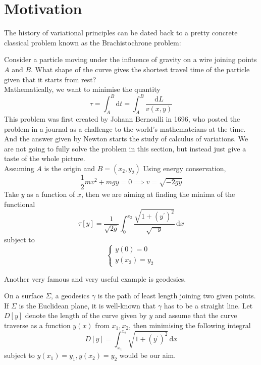 \documentclass{article}
\begin{document}
\maketitle
\tableofcontents
\setcounter{section}{-1}
\newpage

\section{Motivation}
The history of variational principles can be dated back to a pretty concrete classical problem known as the Brachistochrone problem:
\begin{example}
    Consider a particle moving under the influence of gravity on a wire joining points $A$ and $B$.
    What shape of the curve gives the shortest travel time of the particle given that it starts from rest?\\
    Mathematically, we want to minimise the quantity
    $$\tau=\int_A^B\mathrm dt=\int_A^B\frac{\mathrm dL}{v(x,y)}$$
    This problem was first created by Johann Bernoulli in 1696, who posted the problem in a journal as a challenge to the world's mathematcians at the time.
    And the answer given by Newton starts the study of calculus of variations.
    We are not going to fully solve the problem in this section, but instead just give a taste of the whole picture.\\
    Assuming $A$ is the origin and $B=(x_2,y_2)$
    Using energy conservation,
    $$\frac{1}{2}mv^2+mgy=0\implies v=\sqrt{-2gy}$$
    Take $y$ as a function of $x$, then we are aiming at finding the minima of the functional
    $$\tau[y]=\frac{1}{\sqrt{2g}}\int_0^{x_2}\frac{\sqrt{1+(y^\prime)^2}}{\sqrt{-y}}\,\mathrm dx$$
    subject to
    $$\begin{cases}
        y(0)=0\\
        y(x_2)=y_2
    \end{cases}$$
\end{example}
Another very famous and very useful example is geodesics.
\begin{example}[Geodesics]
    On a surface $\Sigma$, a geodesics $\gamma$ is the path of least length joining two given points.
    If $\Sigma$ is the Euclidean plane, it is well-known that $\gamma$ has to be a straight line.
    Let $D[y]$ denote the length of the curve given by $y$ and assume that the curve traverse as a function $y(x)$ from $x_1,x_2$, then minimising the following integral 
    $$D[y]=\int_{x_1}^{x_2}\sqrt{1+(y^\prime)^2}\,\mathrm dx$$
    subject to $y(x_1)=y_1,y(x_2)=y_2$ would be our aim.
\end{example}
\end{document}
